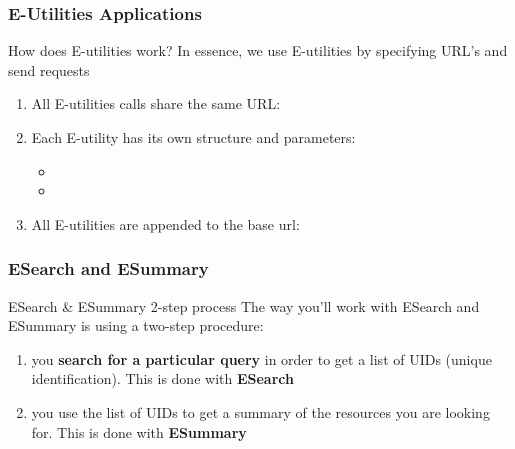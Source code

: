\documentclass{beamer}\usepackage[]{graphicx}\usepackage[]{color}
\begin{document}
\begin{frame}
\frametitle{E-Utilities Applications}

\begin{block}{How does E-utilities work?}
In essence, we use E-utilities by specifying URL's and send requests
\begin{enumerate}
 \item All E-utilities calls share the same URL: \\
 \item Each E-utility has its own structure and parameters: 
 \begin{itemize}
  \item {}
  \item {}
 \end{itemize}
 \item All E-utilities are appended to the base url: \\
{\tiny 
{}
}
\end{enumerate}
\end{block}

\end{frame}


\begin{frame}
\frametitle{ESearch and ESummary}

\begin{block}{ESearch \& ESummary 2-step process}
The way you'll work with ESearch and ESummary is using a two-step procedure:
\begin{enumerate}
 \item you \textbf{search for a particular query} in order to get a list of UIDs (unique identification). This is done with \textbf{ESearch}
 \item you use the list of UIDs to get a summary of the resources you are looking for. This is done with \textbf{ESummary} 
\end{enumerate}
\end{block}

\end{frame}

\end{document}
